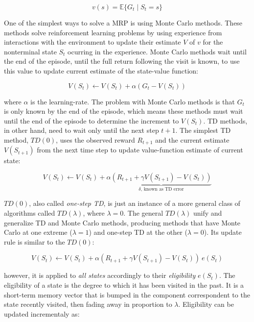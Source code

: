 \documentclass{article}
\begin{document}
    \begin{equation}
        v(s) = \mathbb{E}\{G_{t} \mid S_{t} = s\}\label{eqn:2}
    \end{equation}

    One of the simplest ways to solve a MRP is using Monte Carlo methods.
    These methods solve reinforcement learning problems by using experience from interactions with the environment to update their estimate $V$ of $v$ for the nonterminal state $S_{t}$ ocurring in the experience.
    Monte Carlo methods wait until the end of the episode, until the full return following the visit is known, to use this value to update current estimate of the state-value function:

    \begin{equation}
        V(S_{t}) \leftarrow V(S_{t}) + \alpha(G_{t} - V(S_{t}))\label{eqn:3}
    \end{equation}


    where $\alpha$ is the learning-rate.
    The problem with Monte Carlo methods is that $G_{t}$ is only known by the end of the episode, which means these methods must wait until the end of the episode to determine the increment to $V(S_{t})$.
    TD methods, in other hand, need to wait only until the next step $t + 1$.
    The simplest TD method, $TD(0)$, uses the observed reward $R_{t+1}$ and the current estimate $V(S_{t+1})$ from the next time step to update value-function estimate of current state:

    \begin{equation}
        V(S_{t}) \leftarrow V(S_{t}) + \alpha \underbrace{(R_{t+1} + \gamma V(S_{t+1}) - V(S_{t}))}_{\delta \text{, known as TD error}} \label{eqn:4}
    \end{equation}

    $TD(0)$, also called \emph{one-step TD}, is just an instance of a more general class of algorithms called $TD(\lambda)$, where $\lambda = 0$.
    The general $TD(\lambda)$ unify and generalize TD and Monte Carlo methods, producing methods that have Monte Carlo at one extreme ($\lambda = 1$) and one-step TD at the other ($\lambda = 0$).
    Its update rule is similar to the $TD(0)$:

    \begin{equation}
        V(S_{t}) \leftarrow V(S_{t}) + \alpha (R_{t+1} + \gamma V(S_{t+1}) - V(S_{t})) \: e(S_{t})\label{eqn:5}
    \end{equation}

    however, it is applied to \emph{all states} accordingly to their \emph{eligibility} $e(S_{t})$.
    The eligibility of a state is the degree to which it has been visited in the past.
    It is a short-term memory vector that is bumped in the component correspondent to the state recently visited, then fading away in proportion to $\lambda$.
    Eligibility can be updated incrementaly as:
\end{document}
